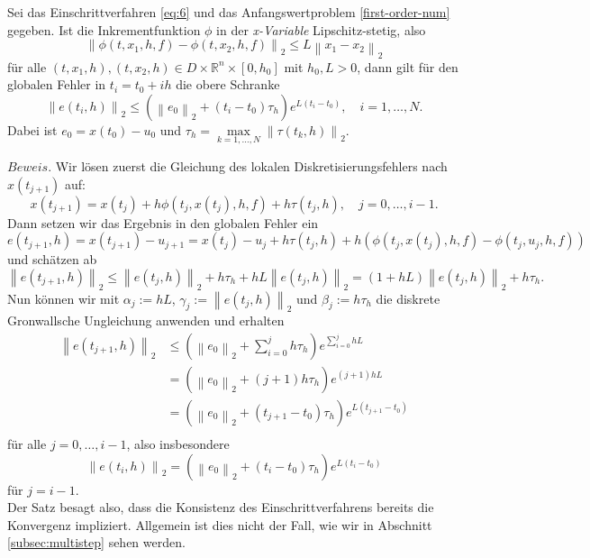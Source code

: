 \begin{satz}
    \label{one-step-error-bound}
    Sei das Einschrittverfahren \eqref{eq:6} und das Anfangswertproblem \eqref{first-order-num} gegeben. Ist  die
    Inkrementfunktion $\phi$ in der \textit{x-Variable} Lipschitz-stetig, also
    \[
        \left\lVert \phi(t, x_1, h, f) - \phi(t, x_2, h, f) \right\rVert_2 \leq L \left\lVert x_1 - x_2 \right\rVert_2
    \]
    für alle $(t, x_1, h),(t, x_2, h) \in D \times \mathbb{R}^n \times [0, h_0]$ mit $h_0, L>0$, dann gilt für den
    globalen Fehler in $t_i = t_0 + ih$ die obere Schranke
    \[
        \left\lVert e(t_i,h) \right\rVert_2 \leq \left( \left\lVert e_0 \right\rVert_2 + (t_i-t_0)\tau_h \right)
        e^{L(t_i-t_0)}, \quad i = 1, \dots, N.
    \]
    Dabei ist $e_0 = x(t_0)-u_0$ und $\tau_h= \max\limits_{k=1,\dots,N} \left\lVert \tau(t_k,h) \right\rVert_2 $.
\end{satz}
$Beweis.$ Wir lösen zuerst die Gleichung des lokalen Diskretisierungsfehlers nach $x(t_{j+1})$ auf:
\[
    x(t_{j+1}) = x(t_j) + h \phi(t_j, x(t_j),h,f) + h \tau(t_j, h), \quad j = 0, \dots , i-1.
\]
Dann setzen wir das Ergebnis in den globalen Fehler ein
\[
    e(t_{j+1},h) = x(t_{j+1}) - u_{j+1} = x(t_j) - u_j + h \tau(t_j, h)
    + h \left( \phi(t_j, x(t_j),h,f) - \phi(t_j, u_j, h, f) \right)
\]
und schätzen ab
\[
    \left\lVert e(t_{j+1},h) \right\rVert_2 \leq \left\lVert e(t_j, h) \right\rVert_2 + h\tau_h
    + hL\left\lVert e(t_j,h) \right\rVert_2 = (1 + hL) \left\lVert e(t_j,h) \right\rVert_2 + h\tau_h.
\]
Nun können wir mit $\alpha_j:=hL$, $\gamma_j:=\left\lVert e(t_j,h) \right\rVert_2$ und $\beta_j := h\tau_h$ die diskrete
Gronwallsche Ungleichung anwenden und erhalten
\begin{align*}
    \left\lVert e(t_{j+1},h) \right\rVert_2
    &\leq ( \left\lVert e_0 \right\rVert_2 + \sum_{i=0}^{j} h\tau_h ) e^{\sum_{i=0}^{j} hL } \\
    &= \left( \left\lVert e_0 \right\rVert_2 + (j+1)h \tau_h \right)e^{(j+1)hL} \\
    &= \left( \left\lVert e_0 \right\rVert_2 + (t_{j+1} - t_0) \tau_h \right)e^{L(t_{j+1} - t_0)} \\
\end{align*}
für alle $j=0, \dots, i-1$, also insbesondere
\[
    \left\lVert e(t_{i},h) \right\rVert_2
    = \left( \left\lVert e_0 \right\rVert_2 + (t_{i} - t_0) \tau_h \right)e^{L(t_{i} - t_0)}
\]
für $j=i-1$.\qedwhite\\
Der Satz besagt also, dass die Konsistenz des Einschrittverfahrens bereits die Konvergenz impliziert. Allgemein ist dies
nicht der Fall, wie wir in Abschnitt \ref{subsec:multistep} sehen werden.
\newpage
